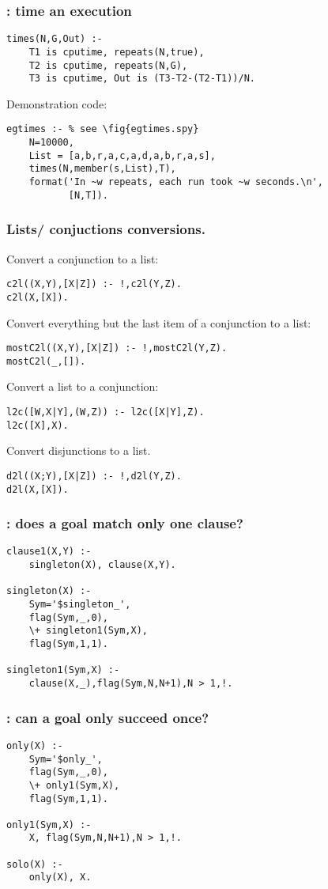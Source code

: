 \subsubsection{ : time an execution
}
\label{sec:times/3}
\begin{Verbatim}
times(N,G,Out) :-
    T1 is cputime, repeats(N,true),
    T2 is cputime, repeats(N,G),
    T3 is cputime, Out is (T3-T2-(T2-T1))/N.
\end{Verbatim}   
Demonstration code:
\begin{Verbatim}
egtimes :- % see \fig{egtimes.spy}
    N=10000,
    List = [a,b,r,a,c,a,d,a,b,r,a,s],
    times(N,member(s,List),T),
    format('In ~w repeats, each run took ~w seconds.\n',
           [N,T]).
\end{Verbatim} 
\subsubsection{ Lists/ conjuctions conversions.
}
Convert a conjunction to a list:
\begin{Verbatim}
c2l((X,Y),[X|Z]) :- !,c2l(Y,Z).
c2l(X,[X]).
\end{Verbatim}
Convert everything but the last item of a conjunction to a list:
\begin{Verbatim}
mostC2l((X,Y),[X|Z]) :- !,mostC2l(Y,Z).
mostC2l(_,[]).
\end{Verbatim}
Convert a list to a conjunction:
\begin{Verbatim}
l2c([W,X|Y],(W,Z)) :- l2c([X|Y],Z).
l2c([X],X).
\end{Verbatim}
Convert disjunctions to a list.
\begin{Verbatim}
d2l((X;Y),[X|Z]) :- !,d2l(Y,Z).
d2l(X,[X]).
\end{Verbatim}
\subsubsection{ : does a goal match only one clause? }\begin{Verbatim}
clause1(X,Y) :- 
    singleton(X), clause(X,Y).

singleton(X) :-
    Sym='$singleton_',
    flag(Sym,_,0),
    \+ singleton1(Sym,X),
    flag(Sym,1,1).

singleton1(Sym,X) :- 
    clause(X,_),flag(Sym,N,N+1),N > 1,!.
\end{Verbatim}
\subsubsection{ : can a goal  only  succeed once? }\begin{Verbatim}
only(X) :-
    Sym='$only_',
    flag(Sym,_,0),
    \+ only1(Sym,X),
    flag(Sym,1,1).

only1(Sym,X) :- 
    X, flag(Sym,N,N+1),N > 1,!.

solo(X) :- 
    only(X), X.
\end{Verbatim}
